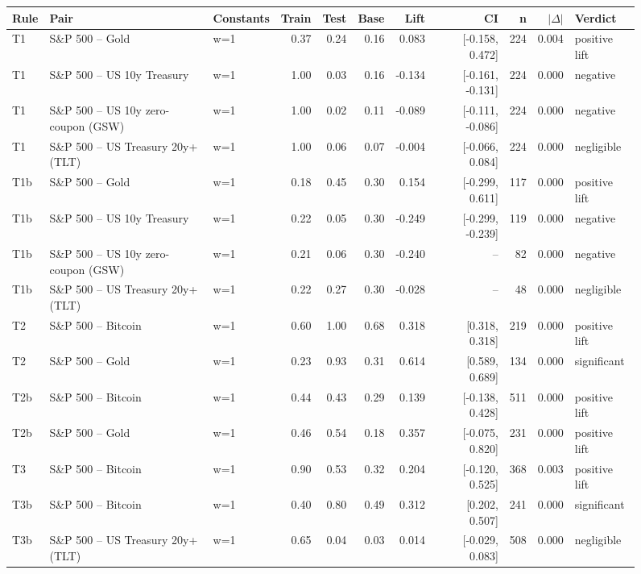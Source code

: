 \begin{figure}
\centering
\begin{tabular}{lllrrrrrrrl}
\toprule
Rule & Pair & Constants & Train & Test & Base & Lift & CI & n & $|\Delta|$ & Verdict \\
\midrule
T1 & S\&P 500 -- Gold & w=1 & 0.37 & 0.24 & 0.16 & 0.083 & [-0.158, 0.472] & 224 & 0.004 & positive lift \\
T1 & S\&P 500 -- US 10y Treasury & w=1 & 1.00 & 0.03 & 0.16 & -0.134 & [-0.161, -0.131] & 224 & 0.000 & negative \\
T1 & S\&P 500 -- US 10y zero-coupon (GSW) & w=1 & 1.00 & 0.02 & 0.11 & -0.089 & [-0.111, -0.086] & 224 & 0.000 & negative \\
T1 & S\&P 500 -- US Treasury 20y+ (TLT) & w=1 & 1.00 & 0.06 & 0.07 & -0.004 & [-0.066, 0.084] & 224 & 0.000 & negligible \\
T1b & S\&P 500 -- Gold & w=1 & 0.18 & 0.45 & 0.30 & 0.154 & [-0.299, 0.611] & 117 & 0.000 & positive lift \\
T1b & S\&P 500 -- US 10y Treasury & w=1 & 0.22 & 0.05 & 0.30 & -0.249 & [-0.299, -0.239] & 119 & 0.000 & negative \\
T1b & S\&P 500 -- US 10y zero-coupon (GSW) & w=1 & 0.21 & 0.06 & 0.30 & -0.240 & -- & 82 & 0.000 & negative \\
T1b & S\&P 500 -- US Treasury 20y+ (TLT) & w=1 & 0.22 & 0.27 & 0.30 & -0.028 & -- & 48 & 0.000 & negligible \\
T2 & S\&P 500 -- Bitcoin & w=1 & 0.60 & 1.00 & 0.68 & 0.318 & [0.318, 0.318] & 219 & 0.000 & positive lift \\
T2 & S\&P 500 -- Gold & w=1 & 0.23 & 0.93 & 0.31 & 0.614 & [0.589, 0.689] & 134 & 0.000 & significant \\
T2b & S\&P 500 -- Bitcoin & w=1 & 0.44 & 0.43 & 0.29 & 0.139 & [-0.138, 0.428] & 511 & 0.000 & positive lift \\
T2b & S\&P 500 -- Gold & w=1 & 0.46 & 0.54 & 0.18 & 0.357 & [-0.075, 0.820] & 231 & 0.000 & positive lift \\
T3 & S\&P 500 -- Bitcoin & w=1 & 0.90 & 0.53 & 0.32 & 0.204 & [-0.120, 0.525] & 368 & 0.003 & positive lift \\
T3b & S\&P 500 -- Bitcoin & w=1 & 0.40 & 0.80 & 0.49 & 0.312 & [0.202, 0.507] & 241 & 0.000 & significant \\
T3b & S\&P 500 -- US Treasury 20y+ (TLT) & w=1 & 0.65 & 0.04 & 0.03 & 0.014 & [-0.029, 0.083] & 508 & 0.000 & negligible \\

\end{tabular}
\end{figure}
